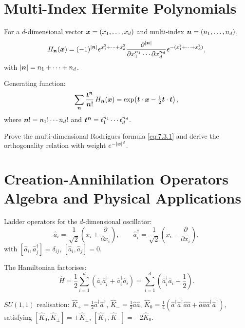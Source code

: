\section{Multi-Index Hermite Polynomials}

For a $d$-dimensional vector $\bm{x}=(x_1,\dots,x_d)$ and multi-index
$\bm{n}=(n_1,\dots,n_d)$,
\begin{equation}
H_{\bm{n}}(\bm{x}) = (-1)^{|\bm{n}|}
e^{x_1^2+\cdots+x_d^2}
\frac{\partial^{|\bm{n}|}}{\partial x_1^{n_1}\cdots\partial x_d^{n_d}}
e^{-(x_1^2+\cdots+x_d^2)},
\label{eq:7.3.1}
\end{equation}
with $|\bm{n}|=n_1+\cdots+n_d$.

Generating function:
\begin{equation}
\sum_{\bm{n}}\frac{\bm{t}^{\bm{n}}}{\bm{n}!}\,
H_{\bm{n}}(\bm{x})
= \exp\!\left(\bm{t}\cdot\bm{x} - \tfrac12\bm{t}\cdot\bm{t}\right),
\label{eq:7.3.2}
\end{equation}
where $\bm{n}! = n_1!\cdots n_d!$ and $\bm{t}^{\bm{n}}=t_1^{n_1}\cdots t_d^{n_d}$.

\begin{exercise}
Prove the multi-dimensional Rodrigues formula \eqref{eq:7.3.1} and
derive the orthogonality relation with weight $e^{-|\bm{x}|^2}$.
\end{exercise}

\section{Creation-Annihilation Operators Algebra and Physical Applications}

Ladder operators for the $d$-dimensional oscillator:
\begin{equation}
\hat a_i = \frac{1}{\sqrt{2}}\!\left(x_i + \frac{\partial}{\partial x_i}\right),\qquad
\hat a_i^\dagger = \frac{1}{\sqrt{2}}\!\left(x_i - \frac{\partial}{\partial x_i}\right),
\label{eq:7.4.1}
\end{equation}
with $[\hat a_i,\hat a_j^\dagger]=\delta_{ij}$, $[\hat a_i,\hat a_j]=0$.

The Hamiltonian factorises:
\begin{equation}
\hat H = \frac12\sum_{i=1}^d (\hat a_i\hat a_i^\dagger + \hat a_i^\dagger\hat a_i)
= \sum_{i=1}^d \left(\hat a_i^\dagger\hat a_i + \frac12\right).
\label{eq:7.4.2}
\end{equation}

$SU(1,1)$ realisation:
$\hat K_+=\frac12\hat a^\dagger\hat a^\dagger$,
$\hat K_-=\frac12\hat a\hat a$,
$\hat K_0=\frac14(\hat a^\dagger\hat a^\dagger\hat a\hat a + \hat a\hat a\hat a^\dagger\hat a^\dagger)$,
satisfying $[\hat K_0,\hat K_\pm]=\pm\hat K_\pm$,
$[\hat K_+,\hat K_-]=-2\hat K_0$.

